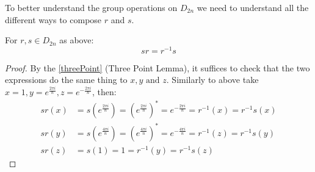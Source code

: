 \documentclass[../main.tex]{subfiles}
\begin{document}
To better understand the group operations on $D_{2n}$ we need to understand all the different ways to compose $r$ and $s$.
\begin{lemma}
  For $r, s \in D_{2n}$ as above:
  \[
    sr = r^{-1}s
  \]
\end{lemma}
\begin{proof}
  By the \cref{threePoint} (Three Point Lemma), it suffices to check that the two expressions do the same thing to $x, y \text{ and }z$.
  Similarly to above take $x = 1, y = e^{\frac{2\pi i}{n}}, z = e^{-\frac{2\pi i}{n}}$, then:
  \begin{align*}
    sr(x) &= s\left(e^{\frac{2\pi i}{n}}\right) = \left(e^{\frac{2\pi i }{n}}\right)^{*} = e^{-\frac{2\pi i}{n}} = r^{-1}(x) = r^{-1}s(x) \\
    sr(y) &= s\left(e^{\frac{4\pi i}{n}}\right) = \left(e^{\frac{4\pi i }{n}}\right)^{*} = e^{-\frac{4\pi i}{n}} = r^{-1}(z) = r^{-1}s(y) \\
    sr(z) &= s(1) = 1 =  r^{-1}(y) = r^{-1}s(z)
  \end{align*}
\end{proof}
\end{document}

